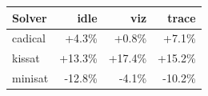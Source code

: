\begin{tabular}{lrrr}
\toprule Solver & idle & viz & trace \\ \midrule
cadical & +4.3\% & +0.8\% & +7.1\% \\
kissat & +13.3\% & +17.4\% & +15.2\% \\
minisat & -12.8\% & -4.1\% & -10.2\% \\
\bottomrule\end{tabular}

